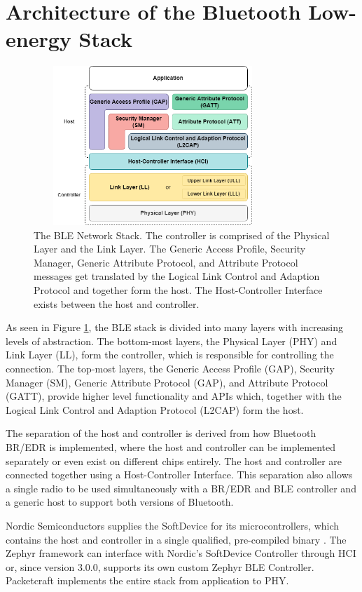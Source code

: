 \section{Architecture of the Bluetooth Low-energy Stack}
\begin{figure}[]
    \centering
    \includegraphics[width=0.8\textwidth,height=6cm,keepaspectratio=true]{images/ble_stack/ble_stack.drawio.png}
    \caption{
        The BLE Network Stack. The controller is comprised of the Physical Layer and the Link Layer. The Generic Access Profile, Security Manager, Generic Attribute Protocol, and Attribute Protocol messages get translated by the Logical Link Control and Adaption Protocol and together form the host. The Host-Controller Interface exists between the host and controller.
    }
    \label{fig:ble_stack}
\end{figure}

As seen in Figure \ref{fig:ble_stack}, the BLE stack is divided into many layers with increasing levels of abstraction. The bottom-most layers, the Physical Layer (PHY) and Link Layer (LL), form the controller, which is responsible for controlling the connection. The top-most layers, the Generic Access Profile (GAP), Security Manager (SM), Generic Attribute Protocol (GAP), and Attribute Protocol (GATT), provide higher level functionality and APIs which, together with the Logical Link Control and Adaption Protocol (L2CAP) form the host.

The separation of the host and controller is derived from how Bluetooth BR/EDR is implemented, where the host and controller can be implemented separately or even exist on different chips entirely. The host and controller are connected together using a Host-Controller Interface. This separation also allows a single radio to be used simultaneously with a BR/EDR and BLE controller and a generic host to support both versions of Bluetooth.

Nordic Semiconductors supplies the SoftDevice for its microcontrollers, which contains the host and controller in a single qualified, pre-compiled binary \cite{nordic_softdevices}. The Zephyr framework can interface with Nordic's SoftDevice Controller through HCI or, since version 3.0.0, supports its own custom Zephyr BLE Controller. Packetcraft implements the entire stack from application to PHY.

